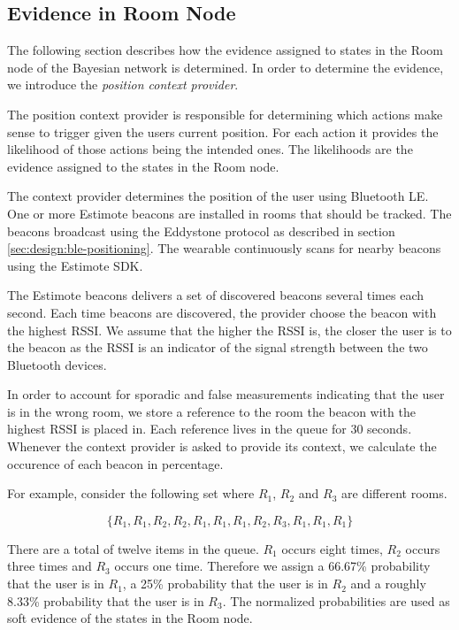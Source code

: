 \subsection{Evidence in Room Node}
\label{sec:design:bayesian-network:room-node-evidence}

The following section describes how the evidence assigned to states in the Room node of the Bayesian network is determined. In order to determine the evidence, we introduce the \emph{position context provider}.

The position context provider is responsible for determining which actions make sense to trigger given the users current position. For each action it provides the likelihood of those actions being the intended ones. The likelihoods are the evidence assigned to the states in the Room node.

The context provider determines the position of the user using Bluetooth LE. One or more Estimote beacons are installed in rooms that should be tracked. The beacons broadcast using the Eddystone protocol as described in section \ref{sec:design:ble-positioning}. The wearable continuously scans for nearby beacons using the Estimote SDK.

The Estimote beacons delivers a set of discovered beacons several times each second. Each time beacons are discovered, the provider choose the beacon with the highest RSSI. We assume that the higher the RSSI is, the closer the user is to the beacon as the RSSI is an indicator of the signal strength between the two Bluetooth devices.

In order to account for sporadic and false measurements indicating that the user is in the wrong room, we store a reference to the room the beacon with the highest RSSI is placed in. Each reference lives in the queue for 30 seconds.  Whenever the context provider is asked to provide its context, we calculate the occurence of each beacon in percentage.

For example, consider the following set where $R_1$, $R_2$ and $R_3$ are different rooms.

\begin{equation*}
  \{ R_1, R_1, R_2, R_2, R_1, R_1, R_1, R_2, R_3, R_1, R_1, R_1 \}
\end{equation*}

There are a total of twelve items in the queue. $R_1$ occurs eight times, $R_2$ occurs three times and $R_3$ occurs one time. Therefore we assign a 66.67\% probability that the user is in $R_1$, a 25\% probability that the user is in $R_2$ and a roughly 8.33\% probability that the user is in $R_3$. The normalized probabilities are used as soft evidence of the states in the Room node.

